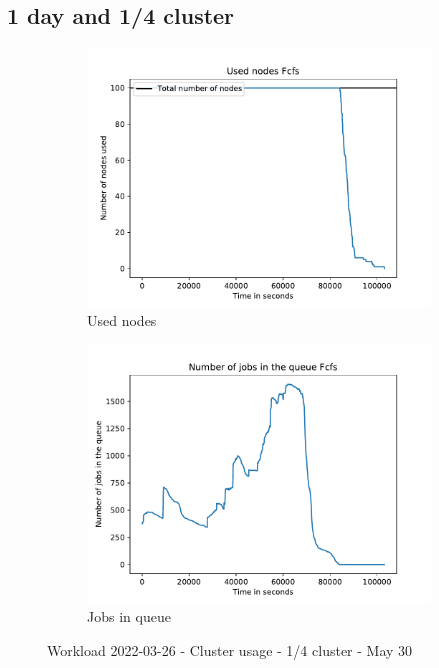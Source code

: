 \documentclass[a4paper]{article}
\begin{document}
	\subsection{1 day and 1/4 cluster}
	\begin{figure}[H]\begin{subfigure}[b]{0.4\linewidth}\centering\includegraphics[width=1\linewidth]{MBSS/plot/2022-03-26->2022-03-26_Fcfs_Used_nodes_95_128_4_256_1_1024.pdf}\caption{Used nodes}\end{subfigure}
	\begin{subfigure}[b]{0.4\linewidth}\centering\includegraphics[width=1\linewidth]{MBSS/plot/2022-03-26->2022-03-26_Fcfs_Nb_scheduled_jobs_95_128_4_256_1_1024.pdf}\caption{Jobs in queue}\end{subfigure}\caption{Workload 2022-03-26 - Cluster usage - 1/4 cluster - May 30}\end{figure}
		
\end{document}
